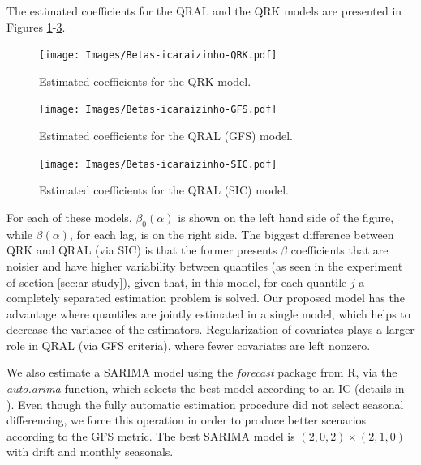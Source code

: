 The estimated coefficients for the QRAL and the QRK models are presented in Figures \ref{fig:betas-qrk}-\ref{fig:betas-sic}.
\begin{figure}[ht]
	\centering
	\texttt{[image: Images/Betas-icaraizinho-QRK.pdf]}
	\caption{Estimated coefficients for the QRK model.}
	\label{fig:betas-qrk}
\end{figure}
\begin{figure}[ht]
	\centering
	\texttt{[image: Images/Betas-icaraizinho-GFS.pdf]}
	\caption{Estimated coefficients for the QRAL (GFS) model.}
	\label{fig:betas-gfs}
\end{figure}
\begin{figure}[ht]
	\centering
	\texttt{[image: Images/Betas-icaraizinho-SIC.pdf]}
	\caption{Estimated coefficients for the QRAL (SIC) model.}
	\label{fig:betas-sic}
\end{figure}
For each of these models, $\beta_0(\alpha)$ is shown on the left hand side of the figure, while $\beta(\alpha)$, for each lag, is on the right side. 
The biggest difference between QRK and QRAL (via SIC) is that the former presents $\beta$ coefficients that are noisier and have higher variability between quantiles (as seen in the experiment of section \ref{sec:ar-study}), given that, in this model, for each quantile $j$ a completely separated estimation problem is solved. Our proposed model has the advantage where quantiles are jointly estimated in a single model, which helps to decrease the variance of the estimators. Regularization of covariates plays a larger role in QRAL (via GFS criteria), where fewer covariates are left nonzero.

We also estimate a SARIMA model using the \emph{forecast} \cite{hyndman2008forecastpackage} package from R, via the \emph{auto.arima} function, which selects the best model according to an IC (details in \cite{hyndman2008forecastmanual}). Even though the fully automatic estimation procedure did not select seasonal differencing, we force this operation in order to produce better scenarios according to the GFS metric. The best SARIMA model is $(2,0,2)\times(2,1,0)$ with drift and monthly seasonals.


